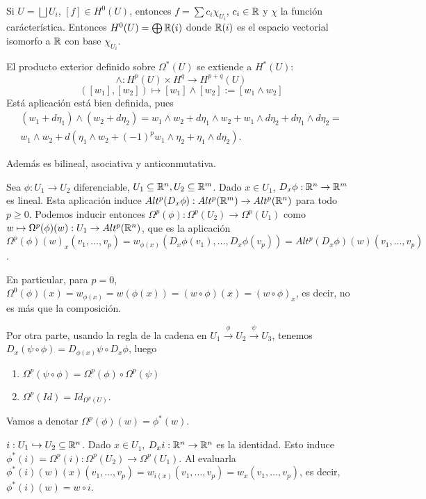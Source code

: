 \documentclass[CV.tex]{subfiles}
\begin{document}
Si $U=\bigsqcup U_i$, $[f]\in H^0(U)$, entonces $f=\sum c_i\chi_{U_i}$, $c_i\in\mathbb{R}$ y $\chi$ la función carácterística. Entonces $H^0(U)=\bigoplus \mathbb{R}(i)$ donde $\mathbb{R}(i)$ es el espacio vectorial isomorfo a $\mathbb{R}$ con base $\chi_{U_i}$. 

El producto exterior definido sobre $\Omega^*(U)$ se extiende a $H^*(U)$:
\[
\land: H^p(U)\times H^q\to H^{p+q}(U)
\]
\[
([w_1],[w_2])\longmapsto [w_1]\land [w_2]:=[w_1\land w_2]
\]
Está aplicación está bien definida, pues
\begin{gather*}
(w_1+d\eta_1)\land(w_2+d\eta_2)=w_1\land w_2+d\eta_1\land w_2+ w_1\land d\eta_2+d\eta_1\land d\eta_2=\\
w_1\land w_2+d(\eta_1\land w_2+(-1)^pw_1\land \eta_2+\eta_1\land d\eta_2).
\end{gather*}

Además es bilineal, asociativa y anticonmutativa.  

Sea $\phi:U_1\to U_2$ diferenciable, $U_1\subseteq\mathbb{R}^n, U_2\subseteq\mathbb{R}^m$. Dado $x\in U_1$, $D_x\phi:\mathbb{R}^n\to \mathbb{R}^m$ es lineal. Esta aplicación induce $Alt^p(D_x\phi): Alt^p(\mathbb{R}^m)\to Alt^p(\mathbb{R}^n)$ para todo $p\geq 0$. Podemos inducir entonces $\Omega^p(\phi):\Omega^p(U_2)\to\Omega^p(U_1)$ como $w\mapsto\Omega^p(\phi)(w):U_1\to Alt^p(\mathbb{R}^n)$, que es la aplicación $\Omega^p(\phi)(w)_x(v_1,\dots, v_p)=w_{\phi(x)}(D_x\phi(v_1),\dots, D_x\phi(v_p))=Alt^p(D_x\phi)(w)(v_1,\dots, v_p)$.

En particular, para $p=0$, $\Omega^0(\phi)(x)=w_{\phi(x)}=w(\phi(x))=(w\circ\phi)(x)=(w\circ\phi)_x$, es decir, no es más que la composición. 

Por otra parte, usando la regla de la cadena en $U_1\overset{\phi}{\to}U_2\overset{\psi}{\to}U_3$, tenemos $D_x(\psi\circ\phi)=D_{\phi(x)}\psi\circ D_x\phi$, luego
\begin{enumerate}
\item $\Omega^p(\psi\circ\phi)=\Omega^p(\phi)\circ\Omega^p(\psi)$
\item $\Omega^p(Id)=Id_{\Omega^p(U)}$.
\end{enumerate}
Vamos a denotar $\Omega^p(\phi)(w)=\phi^*(w)$.
\begin{nota}
$i:U_1\hookrightarrow U_2\subseteq\mathbb{R}^n$. Dado $x\in U_1$, $D_x i:\mathbb{R}^n\to\mathbb{R}^n$ es la identidad. Esto induce $\phi^*(i)=\Omega^p(i):\Omega^p(U_2)\to \Omega^p(U_1)$. Al evaluarla $\phi^*(i)(w)(x)(v_1,\dots, v_p)=w_{i(x)}(v_1,\dots, v_p)=w_x(v_1,\dots, v_p)$, es decir, $\phi^*(i)(w)=w\circ i$.
\end{nota}
\end{document}
